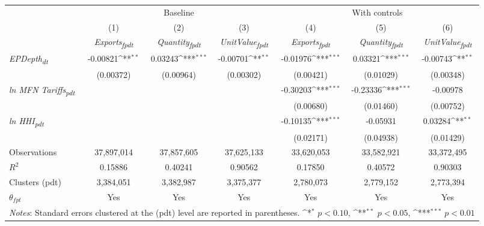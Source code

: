 {
\def\sym#1{\ifmmode^{#1}\else\(^{#1}\)\fi}
\begin{tabular}{l*{6}{c}}
\toprule
&\multicolumn{3}{c}{Baseline}&\multicolumn{3}{c}{With controls}\\\cmidrule(lr){2-4}\cmidrule(lr){5-7}
&(1)&(2)&(3)&(4)&(5)&(6)\\
&\textit{Exports\textsubscript{fpdt}}&\textit{Quantity\textsubscript{fpdt}}&\textit{UnitValue\textsubscript{fpdt}}&\textit{Exports\textsubscript{fpdt}}&\textit{Quantity\textsubscript{fpdt}}&\textit{UnitValue\textsubscript{fpdt}}\\
\midrule
\textit{EPDepth\textsubscript{dt}} & -0.00821\sym{**} & 0.03243\sym{***} & -0.00701\sym{**} & -0.01976\sym{***} & 0.03321\sym{***} & -0.00743\sym{**}\\
 & (0.00372) & (0.00964) & (0.00302) & (0.00421) & (0.01029) & (0.00348)\\
\addlinespace
\textit{ln MFN Tariffs\textsubscript{pdt}} &  &  &  & -0.30203\sym{***} & -0.23336\sym{***} & -0.00978\\
 &  &  &  & (0.00680) & (0.01460) & (0.00752)\\
\addlinespace
\textit{ln HHI\textsubscript{pdt}} &  &  &  & -0.10135\sym{***} & -0.05931 & 0.03284\sym{**}\\
 &  &  &  & (0.02171) & (0.04938) & (0.01429)\\
\midrule
Observations & 37,897,014 & 37,857,605 & 37,625,133 & 33,620,053 & 33,582,921 & 33,372,495\\
$R^{2}$ & 0.15886 & 0.40241 & 0.90562 & 0.17850 & 0.40572 & 0.90303\\
Clusters (pdt) & 3,384,051 & 3,382,987 & 3,375,377 & 2,780,073 & 2,779,152 & 2,773,394\\
$\theta_{fpt}$ & Yes & Yes & Yes & Yes & Yes & Yes\\
\bottomrule
\multicolumn{7}{l}{\footnotesize \textit{Notes}: Standard errors clustered at the (pdt) level are reported in parentheses. \sym{*} \(p<0.10\), \sym{**} \(p<0.05\), \sym{***} \(p<0.01\)}\\
\end{tabular}
}
